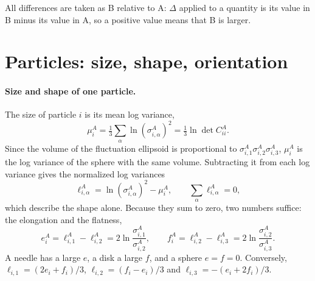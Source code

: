 \documentclass[11pt,a4paper]{article}
\begin{document}
\noindent All differences are taken as B relative to A: $\Delta$ applied to a quantity is its value in B minus its value in A, so a positive value means that B is larger.

\section{Particles: size, shape, orientation}
\label{sec:particles}

\paragraph{Size and shape of one particle.} The size of particle $i$ is its mean log variance,
\begin{equation}
\mu^A_i = \tfrac13\sum_\alpha \ln(\sigma^A_{i,\alpha})^2 = \tfrac13\ln\det C^A_{ii} .
\end{equation}
Since the volume of the fluctuation ellipsoid is proportional to $\sigma^A_{i,1}\sigma^A_{i,2}\sigma^A_{i,3}$, $\mu^A_i$ is the log variance of the sphere with the same volume. Subtracting it from each log variance gives the normalized log variances
\begin{equation}
\ell^A_{i,\alpha} = \ln(\sigma^A_{i,\alpha})^2 - \mu^A_i, \qquad \sum_\alpha \ell^A_{i,\alpha} = 0,
\end{equation}
which describe the shape alone. Because they sum to zero, two numbers suffice: the elongation and the flatness,
\begin{equation}
e^A_i = \ell^A_{i,1}-\ell^A_{i,2} = 2\ln\frac{\sigma^A_{i,1}}{\sigma^A_{i,2}}, \qquad
f^A_i = \ell^A_{i,2}-\ell^A_{i,3} = 2\ln\frac{\sigma^A_{i,2}}{\sigma^A_{i,3}} .
\end{equation}
A needle has a large $e$, a disk a large $f$, and a sphere $e = f = 0$. Conversely, $\ell_{i,1} = (2e_i+f_i)/3$, $\ell_{i,2} = (f_i-e_i)/3$ and $\ell_{i,3} = -(e_i+2f_i)/3$.
\end{document}
